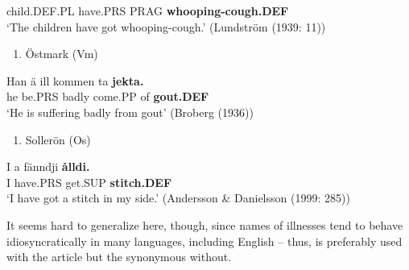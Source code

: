 child.DEF.PL  have.PRS  PRAG  \textbf{whooping-cough.DEF}\\ %


‘The children have got whooping-cough.’ (Lundström (1939: 11))
\z

\begin{enumerate} %
\item 
Östmark (Vm)

\end{enumerate} %
\ea\label{}
\gll Han  ä  ill  kommen  ta  \textbf{jekta.}\\


he  be.PRS  badly  come.PP  of  \textbf{gout.DEF}\\ %


  ‘He is suffering badly from gout’ (Broberg (1936))

\begin{enumerate} %
\item 
Sollerön (Os) 

\end{enumerate} %
\ea\label{}
\gll I  a  fänndji  \textbf{ålldi.} \\


I  have.PRS  get.SUP  \textbf{stitch.DEF} \\ %


‘I have got a stitch in my side.’ (Andersson \& Danielsson (1999: 285))
\z

It seems hard to generalize here, though, since names of illnesses tend to behave idiosyncratically in many languages, including English – thus,  is preferably used with the article but the synonymous  without.

